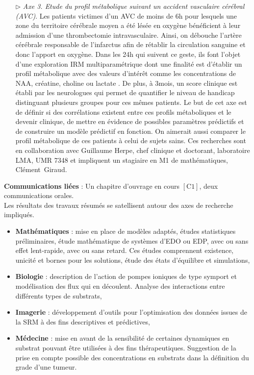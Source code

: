 \documentclass[a4paper, 12pt, twoside, openright]{article}
\begin{document}
\begin{itemize}
\begin{itemize}
\item[$\triangleright$]\textit{Axe 3. Etude du profil métabolique suivant un accident vasculaire cérébral (AVC)}. Les patients victimes d'un AVC de moins de 6h pour lesquels une zone du territoire cérébrale moyen a été lésée en oxygène bénéficient à leur admission d'une thrombectomie intravasculaire. Ainsi, on débouche l’artère cérébrale responsable de l’infarctus afin de rétablir la circulation sanguine et donc l'apport en oxygène. Dans les 24h qui suivent ce geste, ils font l'objet d'une exploration IRM multiparamétrique dont une finalité est d'établir un profil métabolique avec des valeurs d'intérêt comme les concentrations de NAA, créatine, choline ou lactate \cite{bruhn1989,parsons2000}. De plus, à 3mois, un score clinique est établi par les neurologues qui permet de quantifier le niveau de handicap distinguant plusieurs groupes pour ces mêmes patients. Le but de cet axe est de définir si des corrélations existent entre ces profils métaboliques et le devenir clinique, de mettre en évidence de possibles paramètres prédictifs et de construire un modèle prédictif en fonction. On aimerait aussi comparer le profil métabolique de ces patients à celui de sujets sains. Ces recherches sont en collaboration avec Guillaume Herpe, chef clinique et doctorant, laboratoire LMA, UMR 7348 et impliquent un stagiaire en M1 de mathématiques, Clément~Giraud. 
\end{itemize}
\textbf{Communications liées }: Un chapitre d'ouvrage en cours $\left[ \text{C1} \right]$, deux communications orales.\\

Les résultats des travaux résumés se satellisent autour des axes de recherche impliqués.
\begin{itemize}
\item \textbf{Mathématiques} : mise en place de modèles adaptés, études statistiques préliminaires, étude mathématique de systèmes d'EDO ou EDP, avec ou sans effet lent-rapide, avec ou sans retard. Ces études comprennent existence, unicité et bornes pour les solutions, étude des états d'équilibre et simulations,
\item\textbf{ Biologie }: description de l'action de pompes ioniques de type symport et modélisation des flux qui en découlent. Analyse des interactions entre différents types de substrats,
\item \textbf{Imagerie} : développement d'outils pour l'optimisation des données issues de la SRM à des fins descriptives et prédictives,
\item \textbf{Médecine} : mise en avant de la sensibilité de certaines dynamiques en substrat pouvant être utilisées à des fins thérapeutiques. Suggestion de la prise en compte possible des concentrations en substrats dans la définition du grade d'une tumeur.
\end{itemize}


\end{itemize}
\end{document}
